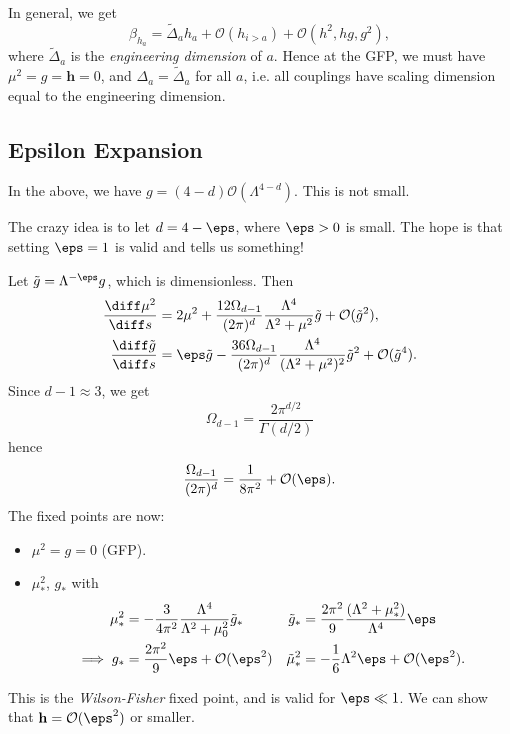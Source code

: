 \documentclass[12pt]{article}
\begin{document}
In general, we get
\[
\beta_{h_a} = \tilde \Delta_a h_a + \mathcal{O}(h_{i > a}) + \mathcal{O}(h^2, hg, g^2),
\]
where $\tilde \Delta_a$ is the \emph{engineering dimension} of $a$. Hence at the GFP, we must have $\mu^2 = g = \mathbf{h} = 0$, and $\Delta_a = \tilde \Delta_a$ for all $a$, i.e. all couplings have scaling dimension equal to the engineering dimension.

\subsection{Epsilon Expansion}%
\label{sub:ee}

In the above, we have $g = (4 - d) \mathcal{O}(\Lambda^{4 - d})$. This is not small.

The crazy idea is to let $d = 4 - \eps$, where $\eps > 0$ is small. The hope is that setting $\eps = 1$ is valid and tells us something!

Let $\tilde g = \Lambda^{-\eps} g$, which is dimensionless. Then
\begin{align*}
	\frac{\diff \mu^2}{\diff s} &= 2 \mu^2 + \frac{12 \Omega_{d-1}}{(2 \pi)^{d}} \frac{\Lambda^{4}}{\Lambda^2 + \mu^2} \tilde g + \mathcal{O}(\tilde g^2), \\
	\frac{\diff \tilde g}{\diff s} &= \eps \tilde g - \frac{36 \Omega_{d-1}}{(2 \pi)^d} \frac{\Lambda^{4}}{(\Lambda^2 + \mu^2)^2} \tilde g^2 + \mathcal{O}(\tilde g^{4}).
\end{align*}
Since $d - 1 \approx 3$, we get
\[
\Omega_{d-1} = \frac{2 \pi^{d/2}}{\Gamma(d/2)}
\]
hence
\[
\frac{\Omega_{d-1}}{(2 \pi)^d} = \frac{1}{8 \pi^2} + \mathcal{O}(\eps).
\]
The fixed points are now:
\begin{itemize}
	\item $\mu^2 = g = 0$ (GFP).
	\item $\mu_\ast^2$, $g_\ast$ with
		\begin{align*}
			\mu_\ast^2 &= - \frac{3}{4 \pi^2} \frac{\Lambda^{4}}{\Lambda^2 + \mu_0^2} \tilde g_\ast & \tilde g_{\ast} &= \frac{2 \pi^2}{9} \frac{( \Lambda^2 + \mu_\ast^2)}{\Lambda^{4}} \eps \\
			\implies g_\ast &= \frac{2 \pi^2}{9} \eps + \mathcal{O}(\eps^2) & \tilde \mu_\ast^2 &= - \frac{1}{6} \Lambda^2 \eps + \mathcal{O}(\eps^2).
		\end{align*}
\end{itemize}
This is the \emph{Wilson-Fisher} fixed point, and is valid for $\eps \ll 1$. We can show that $\mathbf{h} = \mathcal{O}(\eps^2)$ or smaller.
\end{document}
